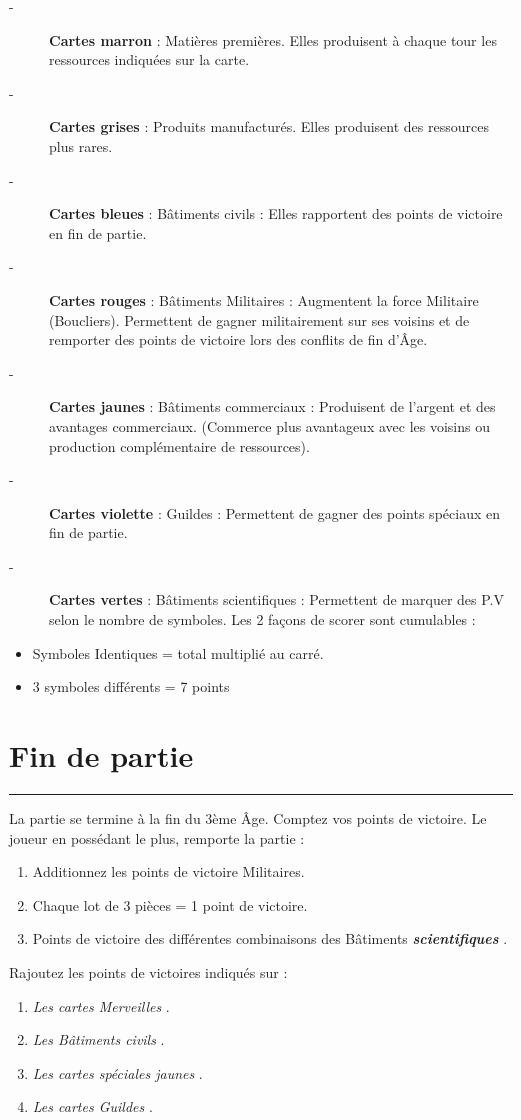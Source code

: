 \documentclass{scrartcl}%
\begin{document}
%
\begin{description}%
\item[{-} ]%
%
\textbf{Cartes marron}%
\textit{ }%
 : Matières premières. Elles produisent à chaque tour les ressources indiquées sur la carte.
%
\item[{-} ]%
%
\textbf{Cartes grises}%
\textit{ }%
 : Produits manufacturés. Elles produisent des ressources plus rares.
%
\item[{-} ]%
%
\textbf{Cartes bleues}%
\textit{ }%
 : Bâtiments civils : Elles rapportent des points de victoire en fin de partie.
%
\item[{-} ]%
%
\textbf{Cartes rouges}%
\textit{ }%
 : Bâtiments Militaires : Augmentent la force Militaire (Boucliers). Permettent de gagner militairement sur ses voisins et de remporter des points de victoire lors des conflits de fin d’Âge.
%
\item[{-} ]%
%
\textbf{Cartes jaunes}%
\textit{ }%
 : Bâtiments commerciaux : Produisent de l’argent et des avantages commerciaux. (Commerce plus avantageux avec les voisins ou production complémentaire de ressources).
%
\item[{-} ]%
%
\textbf{Cartes violette}%
\textit{ }%
 : Guildes : Permettent de gagner des points spéciaux en fin de partie.
%
\item[{-} ]%
%
\textbf{Cartes vertes}%
\textit{ }%
 : Bâtiments scientifiques : Permettent de marquer des P.V selon le nombre de symboles. Les 2 façons de scorer sont cumulables :
%
\end{description}%
\begin{itemize}%
\item%
%
 Symboles Identiques = total multiplié au carré.
%
\item%
%
 3 symboles différents = 7 points
%
\end{itemize}

%
\section{ Fin de partie
}%
\label{sec:Findepartie}%
\rule{18cm}{0.07cm}\break%
La partie se termine à la fin du 3ème Âge. Comptez vos points de victoire. Le joueur en possédant le plus, remporte la partie :
%
\begin{enumerate}%
\item%
%
 Additionnez les points de victoire Militaires.
%
\item%
%
 Chaque lot de 3 pièces = 1 point de victoire.
%
\item%
%
 Points de victoire des différentes combinaisons des Bâtiments %
\textbf{\textit{scientifiques}}%
.
%
\end{enumerate}%
Rajoutez les points de victoires indiqués sur :
%
\begin{enumerate}%
\item%
%
\textit{Les cartes Merveilles}%
.
%
\item%
%
\textit{Les Bâtiments civils}%
. 
%
\item%
%
\textit{Les cartes spéciales jaunes}%
.
%
\item%
%
\textit{Les cartes Guildes}%
.%
\end{enumerate}

%
\end{document}
